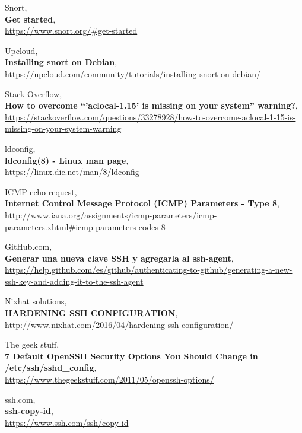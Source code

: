 \documentclass[10pt,a4paper]{article}
\begin{document}
\pagebreak
\begin{thebibliography}{9}

  Snort,\\
  \textbf{Get started},\\
  \url{https://www.snort.org/#get-started}

  Upcloud,\\
  \textbf{Installing snort on Debian},\\
  \url{https://upcloud.com/community/tutorials/installing-snort-on-debian/}
  
  Stack Overflow,\\
  \textbf{How to overcome “'aclocal-1.15' is missing on your system” warning?},\\
  \footnotesize
  \url{https://stackoverflow.com/questions/33278928/how-to-overcome-aclocal-1-15-is-missing-on-your-system-warning}
  \normalsize

   ldconfig,\\
   \textbf{ldconfig(8) - Linux man page},\\
   \url{https://linux.die.net/man/8/ldconfig}

	ICMP echo request,\\
	\textbf{Internet Control Message Protocol (ICMP) Parameters - Type 8},\\
	\url{http://www.iana.org/assignments/icmp-parameters/icmp-parameters.xhtml#icmp-parameters-codes-8}

	GitHub.com,\\
	\textbf{Generar una nueva clave SSH y agregarla al ssh-agent},\\
	  \footnotesize
	\url{https://help.github.com/es/github/authenticating-to-github/generating-a-new-ssh-key-and-adding-it-to-the-ssh-agent}
	  \normalsize
	  
	Nixhat solutions,\\
	\textbf{HARDENING SSH CONFIGURATION},\\
	\url{http://www.nixhat.com/2016/04/hardening-ssh-configuration/}

	The geek stuff,\\
	\textbf{7 Default OpenSSH Security Options You Should Change in /etc/ssh/sshd\_config},\\
	\url{https://www.thegeekstuff.com/2011/05/openssh-options/}
	
	ssh.com,\\
	\textbf{ssh-copy-id},\\
	\url{https://www.ssh.com/ssh/copy-id}


\end{thebibliography}
\end{document}
